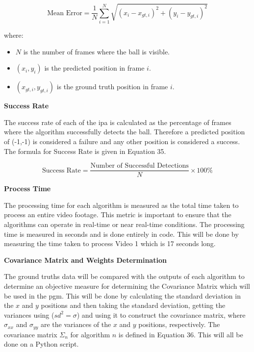 \documentclass[12pt,a4paper]{article}
\begin{document}
\begin{equation}
\text{Mean Error} = \frac{1}{N} \sum_{i=1}^{N} \sqrt{(x_i - x_{gt,i})^2 + (y_i - y_{gt,i})^2}
\end{equation}

where:
\begin{itemize}
	\item $N$ is the number of frames where the ball is visible.
	\item $(x_i, y_i)$ is the predicted position in frame $i$.
	\item $(x_{gt,i}, y_{gt,i})$ is the ground truth position in frame $i$.
\end{itemize}

\textbf{Success Rate}

The success rate of each of the \acs{ipa} is calculated as the percentage of frames where the algorithm successfully detects the ball. Therefore a predicted position of (-1,-1) is considered a failure and any other position is considered a success. The formula for Success Rate is given in Equation 35.

\begin{equation}
\text{Success Rate} = \frac{\text{Number of Successful Detections}}{N} \times 100\%
\end{equation}

\textbf{Process Time}

The processing time for each algorithm is measured as the total time taken to process an entire video footage. This metric is important to ensure that the algorithms can operate in real-time or near real-time conditions. The processing time is measured in seconds and is done entirely in code. This will be done by measuring the time taken to process Video 1 which is 17 seconds long.

\textbf{Covariance Matrix and Weights Determination}

The ground truths data will be compared with the outputs of each algorithm to determine an objective measure for determining the Covariance Matrix which will be used in the \acs{pgm}. This will be done by calculating the standard deviation in the $x$ and $y$ positions and then taking the standard deviation, getting the variances using ($sd^2 = \sigma$) and using it to construct the covariance matrix, where $\sigma_{xx}$ and $\sigma_{yy}$ are the variances of the $x$ and $y$ positions, respectively. The covariance matrix $\Sigma_n$ for algorithm $n$ is defined in Equation 36. This will all be done on a Python script.
\end{document}
